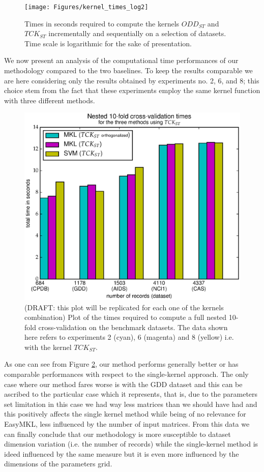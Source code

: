 \begin{figure}[ht]
    \centering
    \texttt{[image: Figures/kernel\_times\_log2]}
    \caption{Times in seconds required to compute the kernels $ODD_{ST}$ and 
    $TCK_{ST}$ incrementally and sequentially on a selection of datasets. Time
    scale is logarithmic for the sake of presentation.}
    \label{fig:times}
\end{figure}

We now present an analysis of the computational time performances of our methodology
compared to the two baselines. To keep the results comparable we are here considering
only the results obtained by experiments no. 2, 6, and 8; this choice stem from the fact
that these experiments employ the same kernel function with three different methods.

\begin{figure}[ht]
    \centering
    \includegraphics[scale=0.7]{Figures/total_times}
    \caption{(DRAFT: this plot will be replicated for each one of the kernels combination)
        Plot of the times required to compute a full nested
        10-fold cross-validation on the benchmark datasets.
        The data shown here refers to experiments 2 (cyan), 6 (magenta) and 8 (yellow)
        i.e. with the kernel $TCK_{ST}$.
    }
    \label{fig:datasetstimes}
\end{figure}

As one can see from Figure \ref{fig:datasetstimes}, our method performs generally
better or has comparable performances with respect to the single-kernel approach.
The only case where our method fares worse is with the GDD dataset and this can be
ascribed to the particular case which it represents, that is, due to the parameters
set limitation in this case we had way less matrices than we should have had and
this positively affects the single kernel method while being of no relevance for
EasyMKL, less influenced by the number of input matrices.
From this data we can finally conclude that our methodology is more susceptible
to dataset dimension variation (i.e. the number of records) while the single-kernel
method is ideed influenced by the same measure but it is even more influenced by
the dimensions of the parameters grid.

